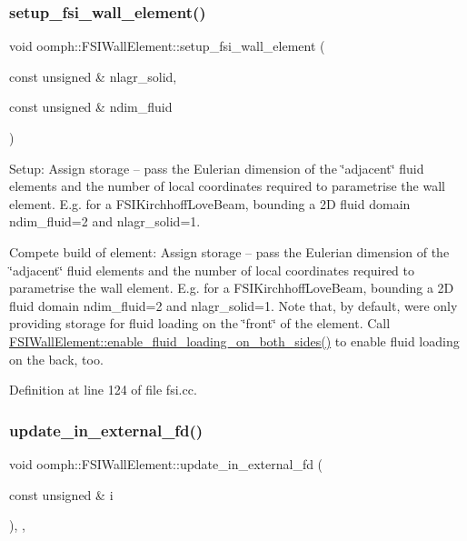 \subsubsection{\texorpdfstring{setup\+\_\+fsi\+\_\+wall\+\_\+element()}{setup\_fsi\_wall\_element()}}
{\footnotesize\ttfamily void oomph\+::\+F\+S\+I\+Wall\+Element\+::setup\+\_\+fsi\+\_\+wall\+\_\+element (\begin{DoxyParamCaption}\item[{const unsigned \&}]{nlagr\+\_\+solid,  }\item[{const unsigned \&}]{ndim\+\_\+fluid }\end{DoxyParamCaption})}



Setup\+: Assign storage -- pass the Eulerian dimension of the \char`\"{}adjacent\char`\"{} fluid elements and the number of local coordinates required to parametrise the wall element. E.\+g. for a F\+S\+I\+Kirchhoff\+Love\+Beam, bounding a 2D fluid domain ndim\+\_\+fluid=2 and nlagr\+\_\+solid=1. 

Compete build of element\+: Assign storage -- pass the Eulerian dimension of the \char`\"{}adjacent\char`\"{} fluid elements and the number of local coordinates required to parametrise the wall element. E.\+g. for a F\+S\+I\+Kirchhoff\+Love\+Beam, bounding a 2D fluid domain ndim\+\_\+fluid=2 and nlagr\+\_\+solid=1. Note that, by default, we\textquotesingle{}re only providing storage for fluid loading on the \char`\"{}front\char`\"{} of the element. Call \hyperlink{classoomph_1_1FSIWallElement_a0dc3efdeb5d0abf0ba473c0145652358}{F\+S\+I\+Wall\+Element\+::enable\+\_\+fluid\+\_\+loading\+\_\+on\+\_\+both\+\_\+sides()} to enable fluid loading on the back, too. 

Definition at line 124 of file fsi.\+cc.

\mbox{\label{classoomph_1_1FSIWallElement_a8274e2b48101edd84f33b6368bc1c90d}} 
\subsubsection{\texorpdfstring{update\+\_\+in\+\_\+external\+\_\+fd()}{update\_in\_external\_fd()}}
{\footnotesize\ttfamily void oomph\+::\+F\+S\+I\+Wall\+Element\+::update\+\_\+in\+\_\+external\+\_\+fd (\begin{DoxyParamCaption}\item[{const unsigned \&}]{i }\end{DoxyParamCaption})\hspace{0.3cm}{\ttfamily [inline]}, {\ttfamily [protected]}, {\ttfamily [virtual]}}



